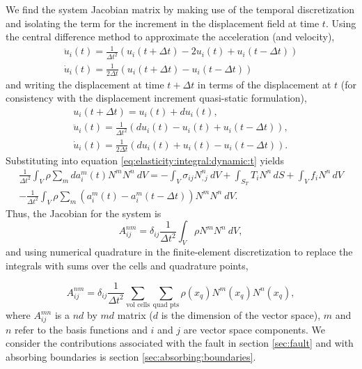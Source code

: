 We find the system Jacobian matrix by making use of the temporal discretization
and isolating the term for the increment in the displacement field
at time $t$. Using the central difference method to approximate the
acceleration (and velocity),
\begin{gather}
\ddot{u}_{i}(t)=\frac{1}{\Delta t^{2}}\left(u_{i}(t+\Delta t)-2u_{i}(t)+u_{i}(t-\Delta t)\right)\\
\dot{u}_{i}(t)=\frac{1}{2\Delta t}\left(u_{i}(t+\Delta t)-u_{i}(t-\Delta t)\right)
\end{gather}
and writing the displacement at time $t+\Delta t$ in terms of the
displacement at $t$ (for consistency with the displacement increment
quasi-static formulation),
\begin{gather}
u_{i}(t+\Delta t)=u_{i}(t)+du_{i}(t),\\
\ddot{u}_{i}(t)=\frac{1}{\Delta t^{2}}\left(du_{i}(t)-u_{i}(t)+u_{i}(t-\Delta t)\right),\\
\dot{u}_{i}(t)=\frac{1}{2\Delta t}\left(du_{i}(t)+u_{i}(t)-u_{i}(t-\Delta t)\right).
\end{gather}
Substituting into equation \eqref{eq:elasticity:integral:dynamic:t}
yields
\begin{multline}
\frac{1}{\Delta t^{2}}\int_{V}\rho\sum_{m}da_{i}^{m}(t)N^{m}N^{n}\ dV=-\int_{V}\sigma_{ij}N_{,j}^{n}\: dV+\int_{S_{T}}T_{i}N^{n}\, dS+\int_{V}f_{i}N^{n}\, dV\\
-\frac{1}{\Delta t^{2}}\int_{V}\rho\sum_{m}(a_{i}^{m}(t)-a_{i}^{m}(t-\Delta t))N^{m}N^{n}\ dV.
\end{multline}
Thus, the Jacobian for the system is
\begin{equation}
A_{ij}^{nm}=\delta_{ij}\frac{1}{\Delta t^{2}}\int_{V}\rho N^{m}N^{n}\ dV,
\end{equation}
and using numerical quadrature in the finite-element discretization
to replace the integrals with sums over the cells and quadrature points,

\begin{equation}
A_{ij}^{nm}=\delta_{ij}\frac{1}{\Delta t^{2}}\sum_{\text{vol cells}}\sum_{\text{quad pts}}\rho(x_{q})N^{m}(x_{q})N^{n}(x_{q}),
\end{equation}
where $A_{ij}^{mn}$ is a $nd$ by $md$ matrix ($d$ is the dimension
of the vector space), $m$ and $n$ refer to the basis functions and
$i$ and $j$ are vector space components. We consider the contributions
associated with the fault in section \ref{sec:fault} and with absorbing
boundaries is section \ref{sec:absorbing:boundaries}.


